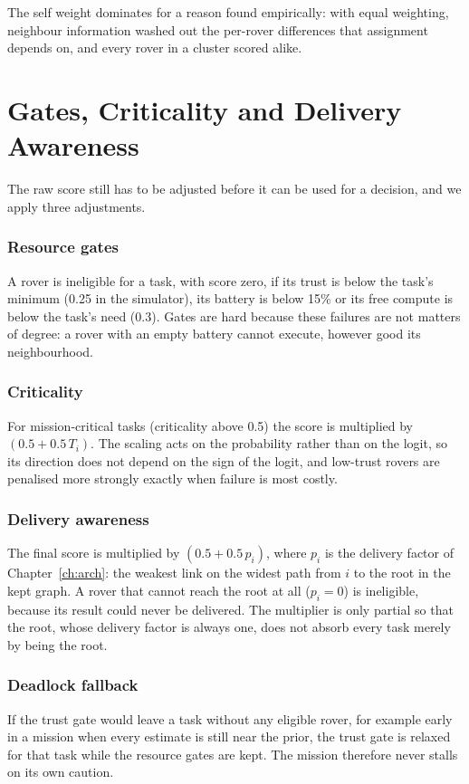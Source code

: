 The self weight dominates for a reason found empirically: with equal
weighting, neighbour information washed out the per-rover differences that
assignment depends on, and every rover in a cluster scored alike.

\section{Gates, Criticality and Delivery Awareness}

The raw score still has to be adjusted before it can be used for a decision,
and we apply three adjustments.

\subsubsection{Resource gates} A rover is ineligible for a task, with score
zero, if its trust is below the task's minimum (0.25 in the simulator), its
battery is below 15\% or its free compute is below the task's need (0.3).
Gates are hard because these failures are not matters of degree: a rover
with an empty battery cannot execute, however good its neighbourhood.

\subsubsection{Criticality} For mission-critical tasks (criticality above
0.5) the score is multiplied by $(0.5+0.5\,T_i)$. The scaling acts on the
probability rather than on the logit, so its direction does not depend on the
sign of the logit, and low-trust rovers are penalised more strongly exactly
when failure is most costly.

\subsubsection{Delivery awareness} The final score is multiplied by
$(0.5+0.5\,p_i)$, where $p_i$ is the delivery factor of
Chapter~\ref{ch:arch}: the weakest link on the widest path from $i$ to the
root in the kept graph. A rover that cannot reach the root at all ($p_i=0$)
is ineligible, because its result could never be delivered. The multiplier is
only partial so that the root, whose delivery factor is always one, does not
absorb every task merely by being the root.

\subsubsection{Deadlock fallback} If the trust gate would leave a task
without any eligible rover, for example early in a mission when every
estimate is still near the prior, the trust gate is relaxed for that task
while the resource gates are kept. The mission therefore never stalls on its
own caution.

